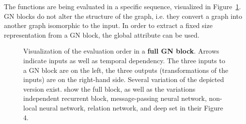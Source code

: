 The functions are being evaluated in a specific sequence, visualized in Figure~\ref{fig:fullgraphblock}. GN blocks do not alter the structure of the graph, i.e. they convert a graph into another graph isomorphic to the input. In order to extract a fixed size representation from a GN block, the global attribute can be used.

\begin{figure}
    \centering

    \caption[Full GN block]{Visualization of the evaluation order in a \textbf{full GN block}. Arrows indicate inputs as well as temporal dependency. The three inputs to a GN block are on the left, the three outputs (transformations of the inputs) are on the right-hand side. Several variation of the depicted version exist. \cite{deepmind:graphnets} show the full block, as well as the variations independent recurrent block, message-passing neural network, non-local neural network, relation network, and deep set in their Figure 4.}
    \label{fig:fullgraphblock}
\end{figure}


